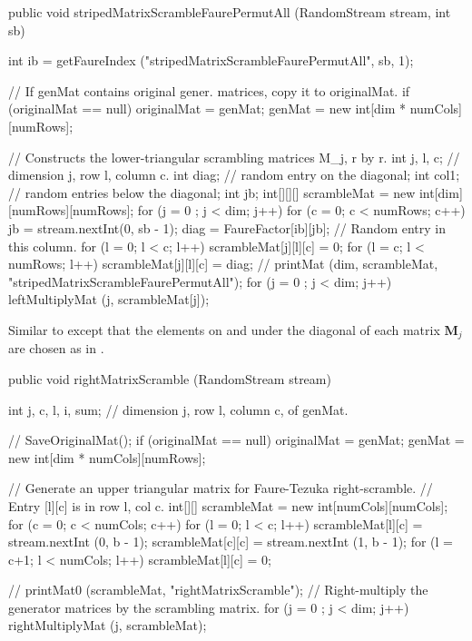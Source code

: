 \begin{code}

   public void stripedMatrixScrambleFaurePermutAll (RandomStream stream,
                                                    int sb)\begin{hide} {
      int ib = getFaureIndex ("stripedMatrixScrambleFaurePermutAll", sb, 1);

      // If genMat contains original gener. matrices, copy it to originalMat.
      if (originalMat == null) {
         originalMat = genMat;
         genMat = new int[dim * numCols][numRows];
      }

      // Constructs the lower-triangular scrambling matrices M_j, r by r.
      int j, l, c;  // dimension j, row l, column c.
      int diag;     // random entry on the diagonal;
      int col1;     // random entries below the diagonal;
      int jb;
      int[][][] scrambleMat = new int[dim][numRows][numRows];
      for (j = 0 ; j < dim; j++) {
         for (c = 0; c < numRows; c++) {
            jb = stream.nextInt(0, sb - 1);
            diag = FaureFactor[ib][jb];  // Random entry in this column.
            for (l = 0; l < c; l++)         scrambleMat[j][l][c] = 0;
            for (l = c; l < numRows; l++) scrambleMat[j][l][c] = diag;
         }
      }
      // printMat (dim, scrambleMat,  "stripedMatrixScrambleFaurePermutAll");
      for (j = 0 ; j < dim; j++) leftMultiplyMat (j, scrambleMat[j]);
   }\end{hide}
\end{code}
 \begin{tabb}
   Similar to  except that the
   elements on and under the diagonal of each matrix $\mathbf{M}_j$ are
   chosen as in .
\end{tabb}
\begin{htmlonly}
\end{htmlonly}
\begin{code}

   public void rightMatrixScramble (RandomStream stream) \begin{hide} {
      int j, c, l, i, sum;  // dimension j, row l, column c, of genMat.

      // SaveOriginalMat();
      if (originalMat == null) {
         originalMat = genMat;
         genMat = new int[dim * numCols][numRows];
      }

      // Generate an upper triangular matrix for Faure-Tezuka right-scramble.
      // Entry [l][c] is in row l, col c.
      int[][] scrambleMat = new int[numCols][numCols];
      for (c = 0; c < numCols; c++) {
         for (l = 0; l < c; l++) scrambleMat[l][c] = stream.nextInt (0, b - 1);
         scrambleMat[c][c] = stream.nextInt (1, b - 1);
         for (l = c+1; l < numCols; l++) scrambleMat[l][c] = 0;
      }

      // printMat0 (scrambleMat,  "rightMatrixScramble");
      // Right-multiply the generator matrices by the scrambling matrix.
      for (j = 0 ; j < dim; j++) rightMultiplyMat (j, scrambleMat);
   }\end{hide}
\end{code}
